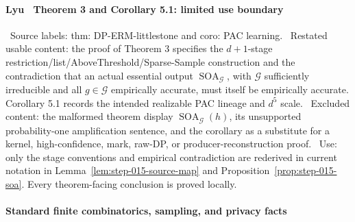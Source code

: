 \paragraph{Lyu~\citep{lyu2025} Theorem 3 and Corollary 5.1: limited use boundary}

\noindent\textbullet\ Source labels: thm: DP-ERM-littlestone and coro: PAC learning.
\noindent\textbullet\ Restated usable content: the proof of Theorem 3 specifies the
  \(d+1\)-stage restriction/list/AboveThreshold/Sparse-Sample construction
  and the contradiction that an actual essential output
  \(\operatorname{SOA}_{\mathcal G}\), with \(\mathcal G\) sufficiently
  irreducible and all \(g\in\mathcal G\) empirically accurate, must itself
  be empirically accurate. Corollary 5.1 records the intended realizable PAC
  lineage and \(d^5\) scale.
\noindent\textbullet\ Excluded content: the malformed theorem display
  \(\operatorname{SOA}_{\mathcal G}(h)\), its unsupported
  probability-one amplification sentence, and the corollary as a substitute
  for a kernel, high-confidence, mark, raw-DP, or producer-reconstruction
  proof.
\noindent\textbullet\ Use: only the stage conventions and empirical contradiction are
  rederived in current notation in
  Lemma~\ref{lem:step-015-source-map} and
  Proposition~\ref{prop:step-015-soa}. Every theorem-facing conclusion is
  proved locally.

\paragraph{Standard finite combinatorics, sampling, and privacy facts}

